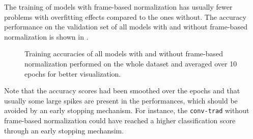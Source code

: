 \FloatBarrier
\noindent
The training of models with frame-based normalization has usually fewer problems with overfitting effects compared to the ones without.
The accuracy performance on the validation set of all models with and without frame-based normalization is shown in .
\begin{figure}[!ht]
  \centering
  \quad
  \caption{Training accuracies of all models with and without frame-based normalization performed on the whole dataset and averaged over 10 epochs for better visualization.}
  \label{fig:exp_final_acc}
\end{figure}
\FloatBarrier
\noindent
Note that the accuracy scores had been smoothed over the epochs and that usually some large spikes are present in the performances, which should be avoided by an early stopping mechanism.
For instance, the \texttt{conv-trad} without frame-based normalization could have reached a higher classification score through an early stopping mechansim.

